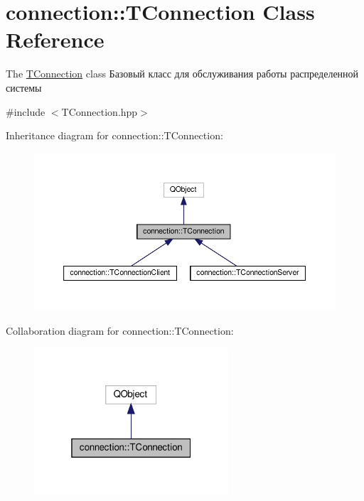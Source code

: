 \hypertarget{classconnection_1_1_t_connection}{}\section{connection\+:\+:T\+Connection Class Reference}
\label{classconnection_1_1_t_connection}


The \hyperlink{classconnection_1_1_t_connection}{T\+Connection} class Базовый класс для обслуживания работы распределенной системы  




{\ttfamily \#include $<$T\+Connection.\+hpp$>$}



Inheritance diagram for connection\+:\+:T\+Connection\+:\nopagebreak
\begin{figure}[H]
\begin{center}
\leavevmode
\includegraphics[width=350pt]{classconnection_1_1_t_connection__inherit__graph}
\end{center}
\end{figure}


Collaboration diagram for connection\+:\+:T\+Connection\+:\nopagebreak
\begin{figure}[H]
\begin{center}
\leavevmode
\includegraphics[width=205pt]{classconnection_1_1_t_connection__coll__graph}
\end{center}
\end{figure}
